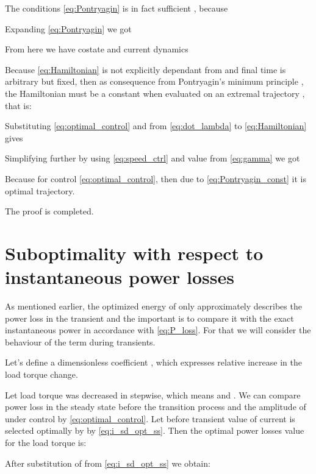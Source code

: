 \documentclass[journal]{IEEEtran}
\begin{document}
The conditions \eqref{eq:Pontryagin} is in fact sufficient \cite{9}, because



Expanding \eqref{eq:Pontryagin} we got



From here we have costate and current dynamics



Because \eqref{eq:Hamiltonian} is not explicitly dependant from  and final time  is arbitrary but fixed, then as consequence from Pontryagin's minimum principle \cite{9}, the Hamiltonian must be a constant when evaluated on an extremal trajectory , that is: 



Substituting \eqref{eq:optimal_control} and  from \eqref{eq:dot_lambda} to \eqref{eq:Hamiltonian} gives



Simplifying further by using \eqref{eq:speed_ctrl} and value  from \eqref{eq:gamma} we got



Because  for control \eqref{eq:optimal_control}, then due to \eqref{eq:Pontryagin_const} it is optimal trajectory.

The proof is completed.

\section{Suboptimality with respect to instantaneous power losses}

As mentioned earlier, the optimized energy of  only approximately describes the power loss in the transient and the important is to compare it with the exact instantaneous power  in accordance with \eqref{eq:P_loss}. For that we will consider the behaviour of the term  during transients. 

Let's define a dimensionless coefficient , which expresses relative increase in the load torque change.

Let load torque was decreased in stepwise, which means  and . We can compare power loss in the steady state before the transition process and the amplitude of  under control  by \eqref{eq:optimal_control}. Let before transient value of current  is selected optimally by  by \eqref{eq:i_sd_opt_ss}. Then the optimal power losses value for the load torque  is:



After substitution of  from \eqref{eq:i_sd_opt_ss} we obtain:
\end{document}
